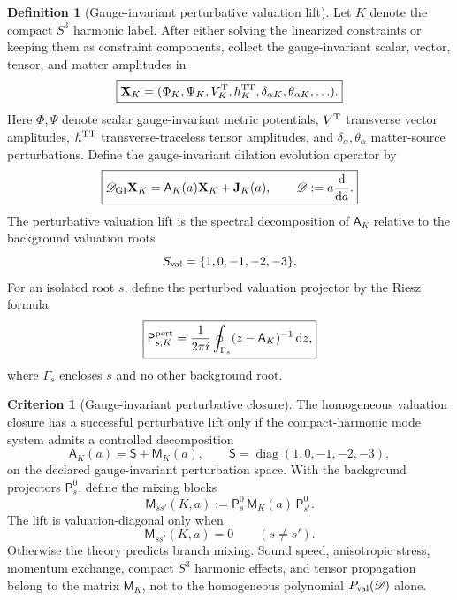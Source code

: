 \documentclass[aps,prd,reprint,nofootinbib,superscriptaddress,floatfix]{revtex4-2}
\numberwithin{equation}{section}
\theoremstyle{definition}
\newtheorem{definition}{Definition}[section]
\newtheorem{criterion}{Criterion}[section]
\theoremstyle{plain}
\newcommand{\dd}{\mathrm d}
\newcommand{\Dil}{\mathscr D}
\begin{document}
\begin{definition}[Gauge-invariant perturbative valuation lift]
\label{def:gi-perturbative-valuation-lift}
Let \(K\) denote the compact \(S^3\) harmonic label.  After either solving the
linearized constraints or keeping them as constraint components, collect the
gauge-invariant scalar, vector, tensor, and matter amplitudes in
\begin{equation}
\boxed{
\mathbf X_K
=
(\Phi_K,\Psi_K,V^{\rm T}_K,h^{\rm TT}_K,
\delta_{\alpha K},\theta_{\alpha K},\ldots).
}
\end{equation}
Here \(\Phi,\Psi\) denote scalar gauge-invariant metric potentials,
\(V^{\rm T}\) transverse vector amplitudes, \(h^{\rm TT}\) transverse-traceless
tensor amplitudes, and \(\delta_{\alpha},\theta_\alpha\) matter-source
perturbations.  Define the gauge-invariant dilation evolution operator by
\begin{equation}
\boxed{
\Dil_{\rm GI}\mathbf X_K
=
\mathsf A_K(a)\mathbf X_K+\mathbf J_K(a),
\qquad
\Dil:=a\frac{\dd}{\dd a}.
}
\end{equation}
The perturbative valuation lift is the spectral decomposition of
\(\mathsf A_K\) relative to the background valuation roots
\[
S_{\rm val}=\{1,0,-1,-2,-3\}.
\]
For an isolated root \(s\), define the perturbed valuation projector by the
Riesz formula
\begin{equation}
\boxed{
\mathsf P^{\rm pert}_{s,K}
=
\frac{1}{2\pi i}
\oint_{\Gamma_s}
(z-\mathsf A_K)^{-1}\,\dd z ,
}
\end{equation}
where \(\Gamma_s\) encloses \(s\) and no other background root.
\end{definition}

\begin{criterion}[Gauge-invariant perturbative closure]
\label{crit:gi-perturbative-closure}
The homogeneous valuation closure has a successful perturbative lift only if
the compact-harmonic mode system admits a controlled decomposition
\begin{equation}
\boxed{
\mathsf A_K(a)=\mathsf S+\mathsf M_K(a),
\qquad
\mathsf S=\operatorname{diag}(1,0,-1,-2,-3),
}
\end{equation}
on the declared gauge-invariant perturbation space.  With the background
projectors \(\mathsf P_s^0\), define the mixing blocks
\begin{equation}
\boxed{
\mathsf M_{ss'}(K,a)
:=
\mathsf P_s^0\,\mathsf M_K(a)\,\mathsf P_{s'}^0 .
}
\end{equation}
The lift is valuation-diagonal only when
\[
\mathsf M_{ss'}(K,a)=0
\qquad (s\ne s').
\]
Otherwise the theory predicts branch mixing.  Sound speed, anisotropic stress,
momentum exchange, compact \(S^3\) harmonic effects, and tensor propagation
belong to the matrix \(\mathsf M_K\), not to the homogeneous polynomial
\(P_{\rm val}(\Dil)\) alone.
\end{criterion}
\end{document}
